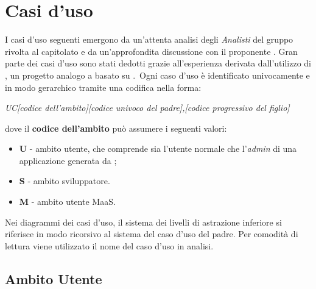 \section{Casi d'uso}
I casi d'uso seguenti emergono da un'attenta analisi degli \textit{Analisti} del gruppo \GroupName{} rivolta al capitolato e da un'approfondita discussione con il proponente \Proponente{}. Gran parte dei casi d'uso sono stati dedotti grazie all'esperienza derivata dall'utilizzo di , un progetto analogo a \ProjectName{} basato su .\
Ogni caso d'uso è identificato univocamente e in modo gerarchico tramite una codifica nella forma:

\begin{center}

\textit{UC[codice dell'ambito][codice univoco del padre],[codice progressivo del figlio]}

\end{center} 

dove il \textbf{codice dell'ambito} può assumere i seguenti valori:

\begin{itemize}

  \item \textbf{U} - ambito utente, che comprende sia l'utente normale che l'\textit{admin} di una applicazione generata da \ProjectName{};
  \item \textbf{S} - ambito sviluppatore.
  \item \textbf{M} - ambito utente MaaS.

\end{itemize}

Nei diagrammi dei casi d'uso, il sistema dei livelli di astrazione inferiore si riferisce in modo ricorsivo al sistema del caso d'uso del padre. 
Per comodità di lettura viene utilizzato il nome del caso d'uso in analisi. 


\subsection{Ambito Utente}
